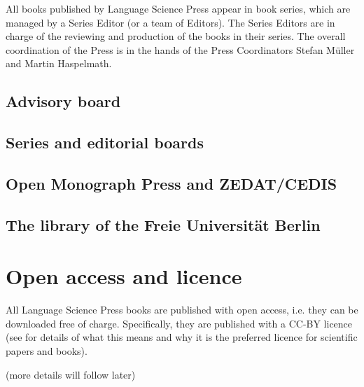 All books published by Language Science Press appear in book series, which are managed by a Series
Editor (or a team of Editors). The Series Editors are in charge of the reviewing and production of
the books in their series. The overall coordination of the Press is in the hands of the Press
Coordinators Stefan Müller and Martin Haspelmath.

\subsection{Advisory board}



\subsection{Series and editorial boards}

\subsection{Open Monograph Press and ZEDAT/CEDIS}

\subsection{The library of the Freie Universität Berlin}


\section{Open access and licence}

All Language Science Press books are published with open access, i.e. they can be downloaded free of charge. Specifically, they are published with a CC-BY licence (see  for details of what this means and why it is the preferred licence for scientific papers and books).

(more details will follow later)
